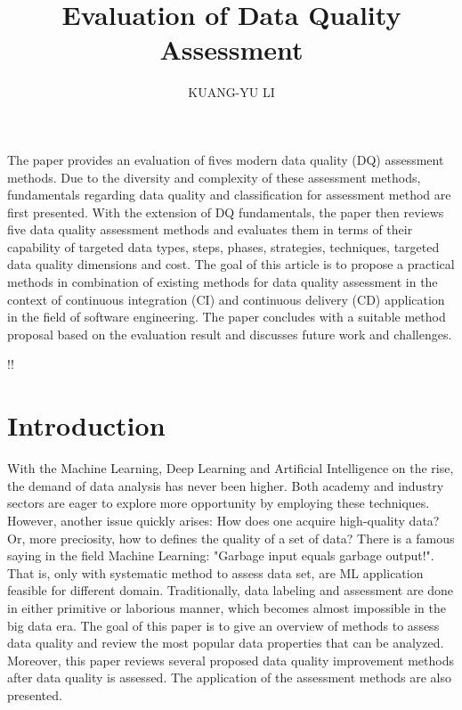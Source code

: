 \documentclass[pdftex,english,oribibl]{llncs}
\title{Evaluation of Data Quality Assessment}
\author{KUANG-YU LI}
\institute{University of Stuttgart\\Master Student in Information Technology \\70569 Stuttgart, Germany}
\makeatletter
\gdef\@keywords{}
\renewenvironment{abstract}{%
  \list{}{\advance\topsep by0.35cm\relax\small%
          \leftmargin=1cm%
          \labelwidth=\z@%
          \listparindent=\z@%
          \itemindent\listparindent%
          \rightmargin\leftmargin}%
          \item[\hskip\labelsep\bfseries\abstractname]}{%
  \if!\@keywords!\else{\item[~]\item[\hskip\labelsep\bfseries\keywordname]\@keywords}\fi%
  \endlist}
\makeatother
\begin{document}
\maketitle

\begin{abstract}
   The paper provides an evaluation of fives modern data quality (DQ) assessment methods. Due to the diversity and complexity of these assessment methods, fundamentals regarding data quality and classification for assessment method are first presented. With the extension of DQ fundamentals, the paper then reviews five data quality assessment methods and evaluates them in terms of their capability of targeted data types, steps, phases, strategies, techniques, targeted data quality dimensions and cost. The goal of this article is to propose a practical methods in combination of existing methods for data quality assessment  in the context of  continuous integration (CI) and  continuous delivery (CD) application in the field of software engineering. The paper concludes with a suitable method proposal based on the evaluation result and discusses future work and challenges.

\end{abstract}
\section{Introduction}
With the Machine Learning, Deep Learning and Artificial Intelligence on the rise, the demand of data analysis has never been higher.
Both academy and industry sectors are eager to explore more opportunity by employing these techniques.
However, another issue quickly arises: How does one acquire high-quality data? Or, more preciosity, how to defines the quality of a set of data?
There is a famous saying in the field Machine Learning: "Garbage input equals garbage output!".
That is, only with systematic method to assess data set, are ML application feasible for different domain.
Traditionally, data labeling and assessment are done in either primitive or laborious manner, which becomes almost impossible in the big data era.
The goal of this paper is to give an overview of methods to assess data quality and review the most popular data properties that can be analyzed.
Moreover, this paper reviews several proposed data quality improvement methods after data quality is assessed.
The application of the assessment methods are also presented.
\end{document}
